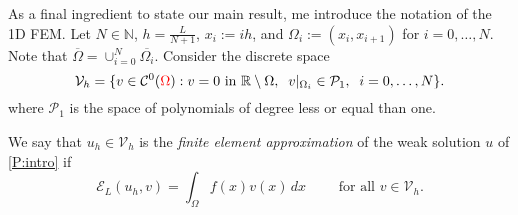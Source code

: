 \documentclass[11 pt]{article}
\numberwithin{equation}{section}
\def\R{\mathbb{R}}
\def\cE{\mathcal{E}}
\newcommand{\B}[1]{{\color{red} #1}}  %
\begin{document}
As a final ingredient to state our main result, me introduce the notation of the 1D FEM.  Let $N\in\mathbb N$, $h=\frac{L}{N+1}$, $x_i:=ih$, and $\Omega_i:=(x_{i},x_{i+1})$ for $i=0,\ldots,N$. Note that $\overline{\Omega}=\cup_{i=0}^N \overline{\Omega_i}$. Consider the discrete space
%
\begin{equation}
    \mathcal V_h=\{v\in \mathcal C^0(\B{\Omega}): v=0 \textnormal{ in } \R\setminus \Omega, \;\; v|_{\Omega_i}\in \mathcal P_1, \;\;  i=0,\ldots,N\}.
\end{equation}
%
where $\mathcal P_1$ is the space of polynomials of degree less or equal than one.

We say that  $u_h\in \mathcal V_h$ is the \emph{finite element approximation} of the weak solution $u$ of \eqref{P:intro} if \begin{equation}\label{eq:discr_problem:intro}
    \cE_{L}(u_h,v)=\int_{\Omega} f(x) v(x)\, dx \qquad \text{ for all } v\in \mathcal V_h.
\end{equation}
\end{document}
